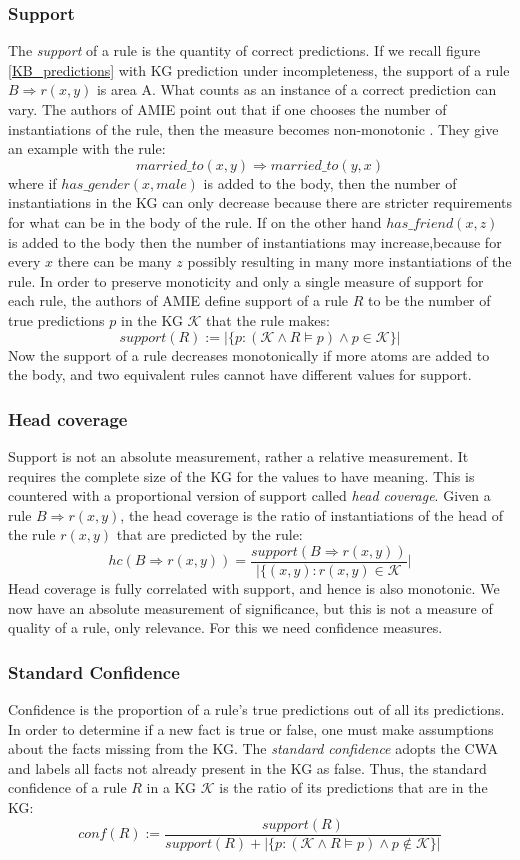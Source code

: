 \subsubsection{Support}
The \textit{support} of a rule is the quantity of correct predictions. If we recall figure \cref{KB_predictions} with KG prediction under incompleteness, the support of a rule $B \Rightarrow r(x,y)$ is area A. What counts as an instance of a correct prediction can vary. The authors of AMIE point out that if one chooses the number of instantiations of the rule, then the measure becomes non-monotonic \cite{amie3}. They give an example with the rule:
\[married\_to(x, y) \Rightarrow married\_to(y, x)\]
where if $has\_gender(x, male)$ is added to the body, then the number of instantiations in the KG can only decrease because there are stricter requirements for what can be in the body of the rule. If on the other hand $has\_friend(x, z)$ is added to the body then the number of instantiations may increase,because for every $x$ there can be many $z$ possibly resulting in many more instantiations of the rule. In order to preserve monoticity and only a single measure of support for each rule, the authors of AMIE define support of a rule $R$ to be the number of true predictions $p$ in the KG $\mathcal{K}$ that the rule makes:
\[support(R) :=  | \{p : (\mathcal{K} \wedge R \models p)\wedge p \in \mathcal{K} \}|\]
Now the support of a rule decreases monotonically if more atoms are added to the body, and two equivalent rules cannot have different values for support.

\subsubsection{Head coverage}
Support is not an absolute measurement, rather a relative measurement. It requires the complete size of the KG for the values to have meaning. This is countered with a proportional version of support called \emph{head coverage}. Given a rule $B \Rightarrow r(x,y)$, the head coverage is the ratio of instantiations of the head of the rule $r(x, y)$ that are predicted by the rule:
\[hc(B \Rightarrow r(x,y)) = \frac{support(B \Rightarrow r(x,y))}{|\{(x, y) : r(x, y) \in \mathcal{K}}|\]
Head coverage is fully correlated with support, and hence is also monotonic. We now have an absolute measurement of significance, but this is not a measure of quality of a rule, only relevance. For this we need confidence measures.


\subsubsection{Standard Confidence} Confidence is the proportion of a rule's true predictions out of all its predictions. In order to determine if a new fact is true or false, one must make assumptions about the facts missing from the KG. The \textit{standard confidence} adopts the CWA and labels all facts not already present in the KG as false. Thus, the standard confidence of a rule $R$ in a KG $\mathcal{K}$ is the ratio of its predictions that are in the KG:
\[conf(R) := \frac{support(R)}{support(R) + | \{p : (\mathcal{K} \wedge R \models p)\wedge p \not\in \mathcal{K} \}|}\]


